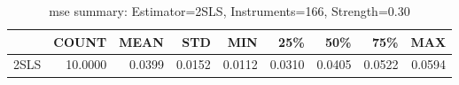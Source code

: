 \begin{table}[ht]
\centering
\caption{mse summary: Estimator=2SLS, Instruments=166, Strength=0.30}
\begin{tabular}{lrrrrrrrr}
\toprule
 & COUNT & MEAN & STD & MIN & 25\% & 50\% & 75\% & MAX \\
\midrule
2SLS & 10.0000 & 0.0399 & 0.0152 & 0.0112 & 0.0310 & 0.0405 & 0.0522 & 0.0594 \\
\bottomrule
\end{tabular}
\end{table}
